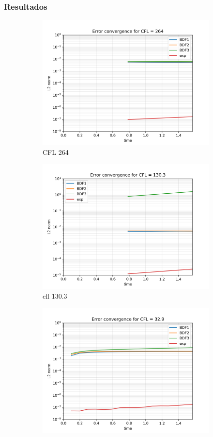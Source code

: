 \documentclass[12pt]{article}
\begin{document}
\subsubsection{Resultados}
\begin{figure}
	\centering
	\begin{subfigure}[b]{0.3\textwidth}
		\centering
		\includegraphics[width=0.7\linewidth]{res/homogeneo/L2norm_CFL_264}
		\caption{CFL 264}
		\label{fig:l2normcfl264}
	\end{subfigure}
	\begin{subfigure}[b]{0.3\textwidth}
		\centering
		\includegraphics[width=0.7\linewidth]{res/homogeneo/L2norm_CFL_130.3}
		\caption{cfl 130.3}
		\label{fig:l2normcfl130}
	\end{subfigure}
	\begin{subfigure}[b]{0.3\textwidth}
		\centering
		\includegraphics[width=0.7\linewidth]{res/homogeneo/L2norm_CFL_32.9}

\end{subfigure}
\end{figure}
\end{document}
